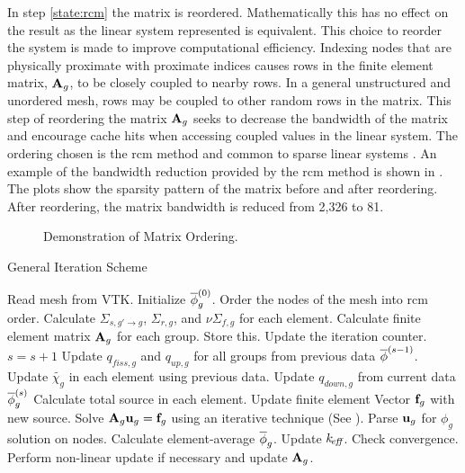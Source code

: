     In step \ref{state:rcm} the matrix is reordered. Mathematically this has no
    effect on the result as the linear system represented is equivalent. This 
    choice to reorder the system is made to improve computational efficiency. 
    Indexing nodes that are physically proximate with proximate indices causes 
    rows in the finite element matrix, $\mathbf{A}_g$, to be closely coupled to nearby
    rows. In a general unstructured and unordered mesh, rows may be coupled to 
    other random rows in the matrix. This step of reordering the matrix $\mathbf{A}_g$ 
    seeks to decrease the bandwidth of the matrix and encourage cache hits when
    accessing coupled values in the linear system. The ordering chosen is the
    \gls{rcm} method and common to sparse linear systems
    \cite{rcm}. An example of the bandwidth reduction provided by the \gls{rcm}
    method is shown in . The plots show the
    sparsity pattern of the matrix before and after reordering. After
    reordering, the matrix bandwidth is reduced from 2,326 to 81.

    \begin{figure}
      \centering
      \hspace{0.1in}
      \caption{Demonstration of  Matrix Ordering.}
      \label{fig:sparsity_pattern}
    \end{figure}
    
    \begin{algorithm}
      \caption{General Iteration Scheme}
      \label{algorithm:general}
      \begin{algorithmic}[1]
      \State Read mesh from VTK.
      \State Initialize $\overline{\phi}_g^{(0)}$.
      \State Order the nodes of the mesh into \gls{rcm} order.
        \label{state:rcm}
      \State Calculate $\Sigma_{s,g'\rightarrow g}$, $\Sigma_{r,g}$, and 
        $\nu \Sigma_{f,g}$ for each element.
      \State Calculate finite element matrix $\mathbf{A}_g$ for each group. Store this. 
        \label{state:fem_matrix}
        \State Update the iteration counter. $s=s+1$
        \State Update $q_{fiss,g}$ and $q_{up,g}$ for all groups from previous 
          data $\overline{\phi}^{(s-1)}$.
        \State Update $\widetilde{\chi_g}$ in each element using previous data.
          \label{state:chi_collapse}
          \State Update $q_{down,g}$ from current data $\overline{\phi}_g^{(s)}$
          \State Calculate total source in each element.
          \State Update finite element Vector $\mathbf{f}_g$ with new source.
            \label{state:fem_vector}
          \State Solve $\mathbf{A}_g \mathbf{u}_g = \mathbf{f}_g$ using an iterative technique (See
            ).
          \State Parse $\mathbf{u}_g$ for $\phi_g$ solution on nodes.
          \State Calculate element-average $\overline{\phi}_g$.
        \EndFor
        \State Update $k_{\!\mbox{\scriptsize \em eff}}$.
        \State Check convergence.
        \State Perform non-linear update if necessary and update $\mathbf{A}_g$. 
          \label{state:nonlinear}
      \EndWhile
      \end{algorithmic}
    \end{algorithm}

